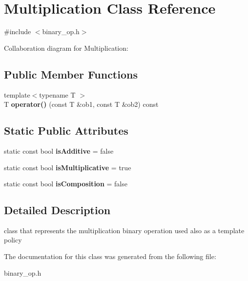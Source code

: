 \hypertarget{classMultiplication}{\section{Multiplication Class Reference}
\label{classMultiplication}
}


{\ttfamily \#include $<$binary\-\_\-op.\-h$>$}



Collaboration diagram for Multiplication\-:
\subsection*{Public Member Functions}
\begin{DoxyCompactItemize}
\item 
\hypertarget{classMultiplication_abc832d7341a7f4a33054e41b8a6883da}{{\footnotesize template$<$typename T $>$ }\\T {\bfseries operator()} (const T \&ob1, const T \&ob2) const }\label{classMultiplication_abc832d7341a7f4a33054e41b8a6883da}

\end{DoxyCompactItemize}
\subsection*{Static Public Attributes}
\begin{DoxyCompactItemize}
\item 
\hypertarget{classMultiplication_a37f52c627c1caa3a1ba0388de58c5dbd}{static const bool {\bfseries is\-Additive} = false}\label{classMultiplication_a37f52c627c1caa3a1ba0388de58c5dbd}

\item 
\hypertarget{classMultiplication_aaf72f7c6c05f7ed984c8e997e0505d60}{static const bool {\bfseries is\-Multiplicative} = true}\label{classMultiplication_aaf72f7c6c05f7ed984c8e997e0505d60}

\item 
\hypertarget{classMultiplication_adbcbdd5feb18d22c1765fbe1b7829840}{static const bool {\bfseries is\-Composition} = false}\label{classMultiplication_adbcbdd5feb18d22c1765fbe1b7829840}

\end{DoxyCompactItemize}


\subsection{Detailed Description}
class that represents the multiplication binary operation used also as a template policy 

The documentation for this class was generated from the following file\-:\begin{DoxyCompactItemize}
\item 
binary\-\_\-op.\-h\end{DoxyCompactItemize}
